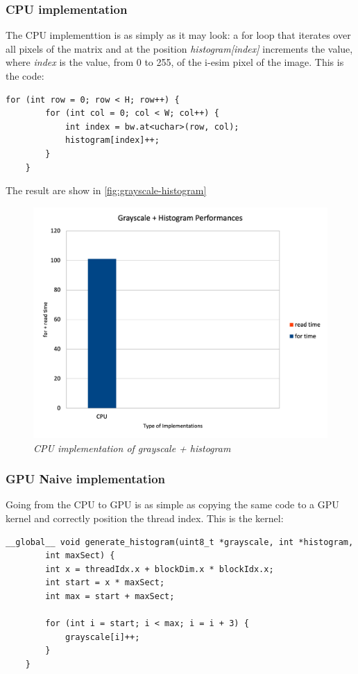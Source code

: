\documentclass[paper=a4, fontsize=10pt]{scrartcl}	%
\begin{document}
	\subsubsection{CPU implementation}

	The CPU implementtion is as simply as it may look: a for loop that iterates over all pixels of the matrix and at the position \textit{histogram[index]} increments the value, where \textit{index} is the value, from 0 to 255, of the i-esim pixel of the image.
	This is the code:
	
	\begin{lstlisting}[style=CStyle]
	for (int row = 0; row < H; row++) {
		for (int col = 0; col < W; col++) {
			int index = bw.at<uchar>(row, col);
			histogram[index]++;
		}
	}
	\end{lstlisting}
	
	The result are show in \autoref{fig:grayscale-histogram}

	\begin{figure}[H]
		\centering
		\includegraphics[width=0.65\linewidth]{images/binarization/hist1.png}
		\caption{\textit{CPU implementation of grayscale + histogram}}
		\label{fig:grayscale-histogram}
	\end{figure}

	
	\subsubsection{GPU Naive implementation}
	
	Going from the CPU to GPU is as simple as copying the same code to a GPU kernel and correctly position the thread index. This is the kernel:
	
	\begin{lstlisting}[style=CStyle]
	__global__ void generate_histogram(uint8_t *grayscale, int *histogram, 
		int maxSect) {
		int x = threadIdx.x + blockDim.x * blockIdx.x;
		int start = x * maxSect;
		int max = start + maxSect;
	
		for (int i = start; i < max; i = i + 3) {
			grayscale[i]++;
		}
	}
	\end{lstlisting}
\end{document}
